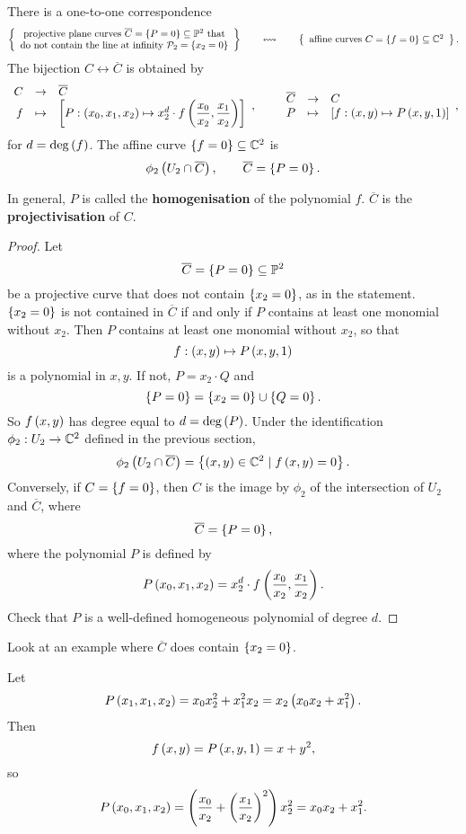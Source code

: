 \begin{theorem}
There is a one-to-one correspondence
$$ \correspondence{\text{projective plane curves} \ \overline{C} = \cb{P = 0} \subseteq \P^2 \ \text{that} \\ \text{do not contain the line at infinity} \ \PP_2 = \cb{x_2 = 0}}{\text{affine curves} \ C = \cb{f = 0} \subseteq \C^2}. $$
The bijection $ C \leftrightarrow \overline{C} $ is obtained by
$$ \function{C}{\overline{C}}{f}{\sb{P : \rb{x_0, x_1, x_2} \mapsto x_2^d \cdot f\rb{\dfrac{x_0}{x_2}, \dfrac{x_1}{x_2}}}}, \qquad \function{\overline{C}}{C}{P}{\sb{f : \rb{x, y} \mapsto P\rb{x, y, 1}}}, $$
for $ d = \deg\left( f \right) $. The affine curve $ \left\{ f = 0 \right\} \subseteq \mathbb{C}^2 $ is
$$ \phi_2\left( U_2 \cap \overline{C} \right), \qquad \overline{C} = \left\{ P = 0 \right\}. $$
\end{theorem}

\begin{notation}
In general, $ P $ is called the \textbf{homogenisation} of the polynomial $ f $. $ \overline{C} $ is the \textbf{projectivisation} of $ C $.
\end{notation}

\pagebreak

\begin{proof}
Let
$$ \overline{C} = \left\{ P = 0 \right\} \subseteq \mathbb{P}^2 $$
be a projective curve that does not contain $ \left\{ x_2 = 0 \right\} $, as in the statement. $ \left\{ x_2 = 0 \right\} $ is not contained in $ \overline{C} $ if and only if $ P $ contains at least one monomial without $ x_2 $. Then $ P $ contains at least one monomial without $ x_2 $, so that
$$ f : \left( x, y \right) \mapsto P\left( x, y, 1 \right) $$
is a polynomial in $ x, y $. If not, $ P = x_2 \cdot Q $ and
$$ \left\{ P = 0 \right\} = \left\{ x_2 = 0 \right\} \cup \left\{ Q = 0 \right\}. $$
So $ f\left( x, y \right) $ has degree equal to $ d = \deg\left( P \right) $. Under the identification $ \phi_2 : U_2 \to \mathbb{C}^2 $ defined in the previous section,
$$ \phi_2\left( U_2 \cap \overline{C} \right) = \left\{ \left( x, y \right) \in \mathbb{C}^2 \mid f\left( x, y \right) = 0 \right\}. $$
Conversely, if $ C = \left\{ f = 0 \right\} $, then $ C $ is the image by $ \phi_2 $ of the intersection of $ U_2 $ and $ \overline{C} $, where
$$ \overline{C} = \left\{ P = 0 \right\}, $$
where the polynomial $ P $ is defined by
$$ P\left( x_0, x_1, x_2 \right) = x_2^d \cdot f\left( \dfrac{x_0}{x_2}, \dfrac{x_1}{x_2} \right). $$
Check that $ P $ is a well-defined homogeneous polynomial of degree $ d $.
\end{proof}

Look at an example where $ \overline{C} $ does contain $ \left\{ x_2 = 0 \right\} $.

\begin{example*}
Let
$$ P\left( x_1, x_1, x_2 \right) = x_0x_2^2 + x_1^2x_2 = x_2\left( x_0x_2 + x_1^2 \right). $$
Then
$$ f\left( x, y \right) = P\left( x, y, 1 \right) = x + y^2, $$
so
$$ P\left( x_0, x_1, x_2 \right) = \left( \dfrac{x_0}{x_2} + \left( \dfrac{x_1}{x_2} \right)^2 \right)x_2^2 = x_0x_2 + x_1^2. $$
\end{example*}

